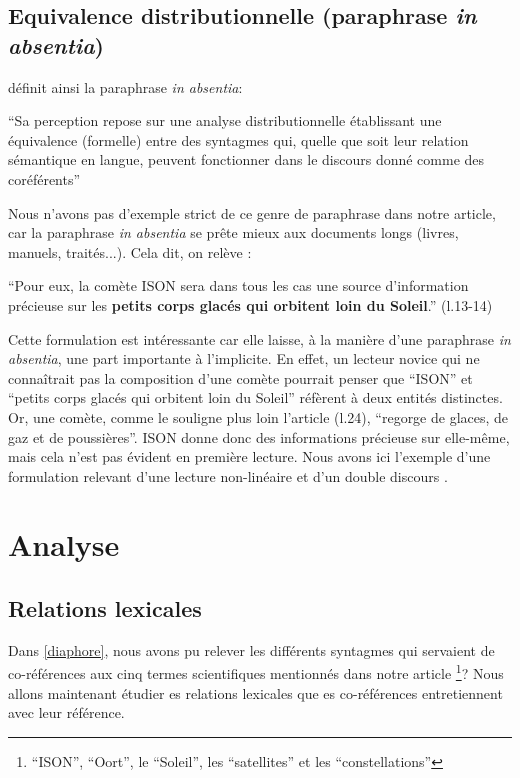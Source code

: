 \documentclass[a4paper,10pt]{article}
\begin{document}
	\subsection{Equivalence distributionnelle (paraphrase \textit{in absentia})}
		\cite{Mortureux1993} définit ainsi la paraphrase \textit{in absentia}:
		\begin{center}
			\footnotesize
			\begin{minipage}{0.7\textwidth}
				``Sa perception repose sur une analyse distributionnelle établissant une équivalence (formelle) entre des syntagmes qui, quelle que soit leur relation sémantique en langue, peuvent fonctionner dans le discours donné comme des coréférents''
			\end{minipage}
		\end{center}
		Nous n'avons pas d'exemple strict de ce genre de paraphrase dans notre article, car la paraphrase \textit{in absentia} se prête mieux aux documents longs (livres, manuels, traités...). Cela dit, on relève :
		\begin{center}
			\footnotesize
			\begin{minipage}{0.7\textwidth}
				``Pour eux, la comète ISON sera dans tous les cas une source d'information précieuse sur les \textbf{petits corps glacés qui orbitent loin du Soleil}.'' (l.13-14)
			\end{minipage}
		\end{center}
		Cette formulation est intéressante car elle laisse, à la manière d'une paraphrase \textit{in absentia}, une part importante à l'implicite. En effet, un lecteur novice qui ne connaîtrait pas la composition d'une comète pourrait penser que ``ISON'' et ``petits corps glacés qui orbitent loin du Soleil'' réfèrent à deux entités distinctes. Or, une comète, comme le souligne plus loin l'article (l.24), ``regorge de glaces, de gaz et de poussières''. ISON donne donc des informations précieuse sur elle-même, mais cela n'est pas évident en première lecture. Nous avons ici l'exemple d'une formulation relevant d'une lecture non-linéaire et d'un double discours \cite{Mortureux1984}.
		
\section{Analyse}
	\subsection{Relations lexicales}
		Dans \ref{diaphore}, nous avons pu relever les différents syntagmes qui servaient de co-références aux cinq termes scientifiques mentionnés dans notre article \footnote{``ISON'', ``Oort'', le ``Soleil'', les ``satellites'' et les ``constellations''}? Nous allons maintenant étudier es relations lexicales que es co-références entretiennent avec leur référence.
\end{document}
